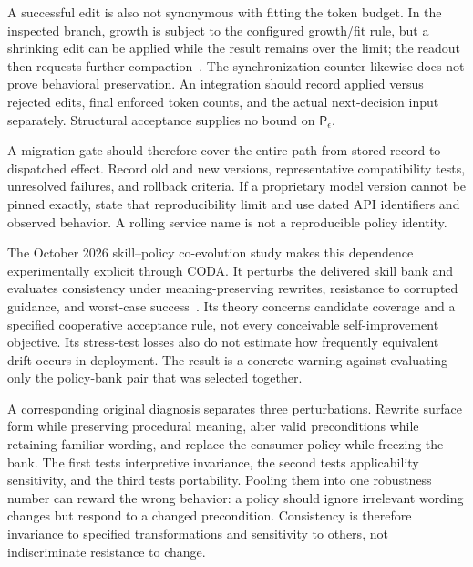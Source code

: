 A successful edit is also not synonymous with fitting the token budget. In the inspected  branch, growth is subject to the configured growth/fit rule, but a shrinking edit can be applied while the result remains over the limit; the readout then requests further compaction~\cite{repo_clm2026}. The synchronization counter likewise does not prove behavioral preservation. An integration should record applied versus rejected edits, final enforced token counts, and the actual next-decision input separately. Structural acceptance supplies no bound on $\mathsf P_\epsilon$.

A migration gate should therefore cover the entire path from stored record to dispatched effect. Record old and new versions, representative compatibility tests, unresolved failures, and rollback criteria. If a proprietary model version cannot be pinned exactly, state that reproducibility limit and use dated API identifiers and observed behavior. A rolling service name is not a reproducible policy identity.

The October 2026 skill--policy co-evolution study makes this dependence experimentally explicit through CODA. It perturbs the delivered skill bank and evaluates consistency under meaning-preserving rewrites, resistance to corrupted guidance, and worst-case success~\cite{feng2026coda}. Its theory concerns candidate coverage and a specified cooperative acceptance rule, not every conceivable self-improvement objective. Its stress-test losses also do not estimate how frequently equivalent drift occurs in deployment. The result is a concrete warning against evaluating only the policy-bank pair that was selected together.

A corresponding original diagnosis separates three perturbations. Rewrite surface form while preserving procedural meaning, alter valid preconditions while retaining familiar wording, and replace the consumer policy while freezing the bank. The first tests interpretive invariance, the second tests applicability sensitivity, and the third tests portability. Pooling them into one robustness number can reward the wrong behavior: a policy should ignore irrelevant wording changes but respond to a changed precondition. Consistency is therefore invariance to specified transformations and sensitivity to others, not indiscriminate resistance to change.

